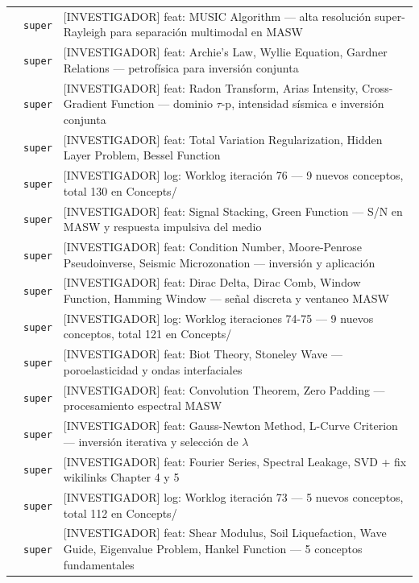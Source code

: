 \begin{longtable}{@{}p{1.7cm} p{1.5cm} p{12.2cm}@{}}
 & \texttt{\scriptsize super} & [INVESTIGADOR] feat: MUSIC Algorithm --- alta resolución super-Rayleigh para separación multimodal en MASW \\
 & \texttt{\scriptsize super} & [INVESTIGADOR] feat: Archie's Law, Wyllie Equation, Gardner Relations --- petrofísica para inversión conjunta \\
 & \texttt{\scriptsize super} & [INVESTIGADOR] feat: Radon Transform, Arias Intensity, Cross-Gradient Function --- dominio $\tau$-p, intensidad sísmica e inversión conjunta \\
 & \texttt{\scriptsize super} & [INVESTIGADOR] feat: Total Variation Regularization, Hidden Layer Problem, Bessel Function \\
 & \texttt{\scriptsize super} & [INVESTIGADOR] log: Worklog iteración 76 --- 9 nuevos conceptos, total 130 en Concepts/ \\
 & \texttt{\scriptsize super} & [INVESTIGADOR] feat: Signal Stacking, Green Function --- S/N en MASW y respuesta impulsiva del medio \\
 & \texttt{\scriptsize super} & [INVESTIGADOR] feat: Condition Number, Moore-Penrose Pseudoinverse, Seismic Microzonation --- inversión y aplicación \\
 & \texttt{\scriptsize super} & [INVESTIGADOR] feat: Dirac Delta, Dirac Comb, Window Function, Hamming Window --- señal discreta y ventaneo MASW \\
 & \texttt{\scriptsize super} & [INVESTIGADOR] log: Worklog iteraciones 74-75 --- 9 nuevos conceptos, total 121 en Concepts/ \\
 & \texttt{\scriptsize super} & [INVESTIGADOR] feat: Biot Theory, Stoneley Wave --- poroelasticidad y ondas interfaciales \\
 & \texttt{\scriptsize super} & [INVESTIGADOR] feat: Convolution Theorem, Zero Padding --- procesamiento espectral MASW \\
 & \texttt{\scriptsize super} & [INVESTIGADOR] feat: Gauss-Newton Method, L-Curve Criterion --- inversión iterativa y selección de $\lambda$ \\
 & \texttt{\scriptsize super} & [INVESTIGADOR] feat: Fourier Series, Spectral Leakage, SVD + fix wikilinks Chapter 4 y 5 \\
 & \texttt{\scriptsize super} & [INVESTIGADOR] log: Worklog iteración 73 --- 5 nuevos conceptos, total 112 en Concepts/ \\
 & \texttt{\scriptsize super} & [INVESTIGADOR] feat: Shear Modulus, Soil Liquefaction, Wave Guide, Eigenvalue Problem, Hankel Function --- 5 conceptos fundamentales \\

\end{longtable}
